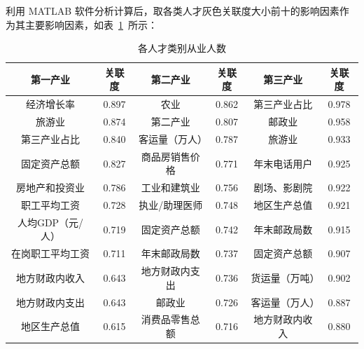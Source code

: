 \documentclass{whutmod}
\begin{document}
	利用 MATLAB 软件分析计算后，取各类人才灰色关联度大小前十的影响因素作为其主要影响因素，如表~\ref{guan}~所示：
		\begin{table}[H]
		\centering
		\caption{各人才类别从业人数}\label{guan}
		\begin{tabular}{cccccc}
			\toprule[2pt]
			\multicolumn{1}{m{3cm}}{\centering 第一产业}&
			\multicolumn{1}{m{1.5cm}|}{\centering 关联度} & \multicolumn{1}{m{3cm}}{\centering 第二产业} & \multicolumn{1}{m{1.5cm}|}{\centering 关联度}&
			\multicolumn{1}{m{3cm}}{\centering 第三产业} & \multicolumn{1}{m{1.5cm}}{\centering 关联度}\\
			\midrule[1pt]
			经济增长率	 &  0.897 & 农业&0.862&第三产业占比&0.978\\ 
			旅游业 &  0.874&第二产业&0.807&邮政业&0.958\\ 
			第三产业占比	 &  0.840&客运量（万人）&0.787&旅游业&0.933\\ 
			固定资产总额&  0.827& 商品房销售价格&0.771&年末电话用户&0.925\\ 
			房地产和投资业  & 0.786& 工业和建筑业&0.756&剧场、影剧院&0.922\\
			职工平均工资  &0.728& 执业/助理医师&0.748&地区生产总值&0.921\\
			人均GDP（元/人）  & 0.719& 固定资产总额&0.742&年末邮政局数&0.915\\
			在岗职工平均工资  & 0.711& 年末邮政局数&0.737&固定资产总额&0.907\\
			地方财政内收入  & 0.643& 地方财政内支出&0.736&货运量（万吨）&0.902\\
			地方财政内支出&0.643& 邮政业&0.726&客运量（万人）&0.887\\
			地区生产总值&0.615&消费品零售总额&0.716&地方财政内收入&0.880\\
			\bottomrule[2pt]
		\end{tabular}
	\end{table}
	
	
\end{document}
